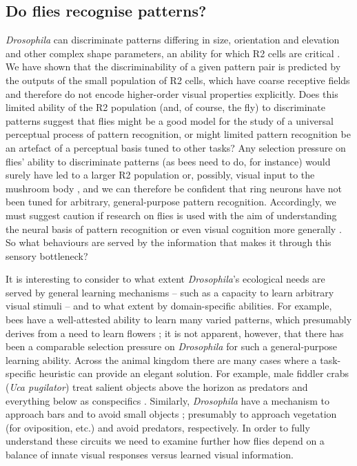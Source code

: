 \subsection*{Do flies recognise patterns?}
\emph{Drosophila} can discriminate patterns differing in size, orientation and elevation and other complex shape parameters, an ability for which R2 cells are critical \cite{Ernst1999,Liu2006,Pan2009}.
We have shown that the discriminability of a given pattern pair is predicted by the outputs of the small population of R2 cells, which have coarse receptive fields and therefore do not encode higher-order visual properties explicitly.
Does this limited ability of the R2 population (and, of course, the fly) to discriminate patterns suggest that flies might be a good model for the study of a universal perceptual process of pattern recognition, or might limited pattern recognition be an artefact of a perceptual basis tuned to other tasks?
Any selection pressure on flies’ ability to discriminate patterns (as bees need to do, for instance) would surely have led to a larger R2 population or, possibly, visual input to the mushroom body \cite{Ehmer2002,Wolf1998}, and we can therefore be confident that ring neurons have not been tuned for arbitrary, general-purpose pattern recognition.
Accordingly, we must suggest caution if research on flies is used with the aim of understanding the neural basis of pattern recognition or even visual cognition more generally \cite{Menzel2001}.
So what behaviours are served by the information that makes it through this sensory bottleneck?

It is interesting to consider to what extent \emph{Drosophila}'s ecological needs are served by general learning mechanisms -- such as a capacity to learn arbitrary visual stimuli -- and to what extent by domain-specific abilities.
For example, bees have a well-attested ability to learn many varied patterns, which presumably derives from a need to learn flowers \cite{Gould1985}; it is not apparent, however, that there has been a comparable selection pressure on \emph{Drosophila} for such a general-purpose learning ability.
Across the animal kingdom there are many cases where a task-specific heuristic can provide an elegant solution.
For example, male fiddler crabs (\emph{Uca pugilator}) treat salient objects above the horizon as predators and everything below as conspecifics \cite{Layne1997}.
Similarly, \emph{Drosophila} have a mechanism to approach bars and to avoid small objects \cite{Maimon2008}; presumably to approach vegetation (for oviposition, etc.) and avoid predators, respectively.
In order to fully understand these circuits we need to examine further how flies depend on a balance of innate visual responses versus learned visual information.

